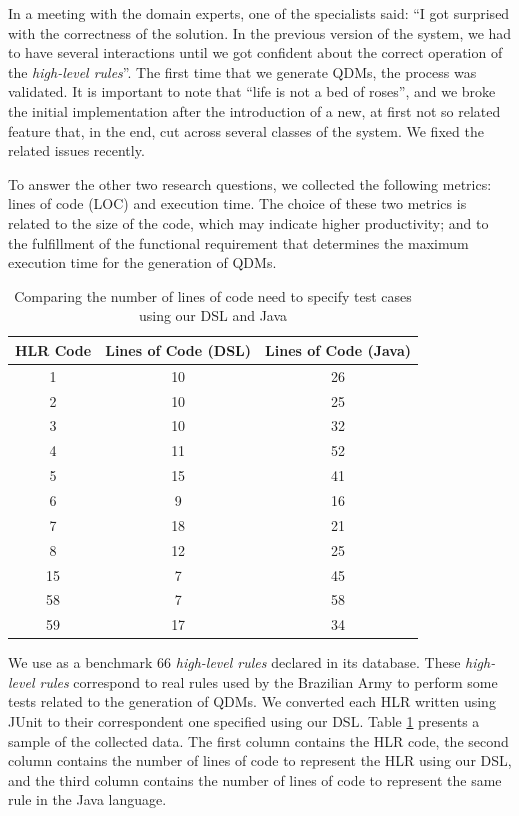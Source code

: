 \documentclass{bmcart}
\newcommand{\callers}{\emph{high-level rules}\xspace}
\newcommand{\shc}{HLR\xspace}
\begin{document}
In a meeting with the domain experts, one of the specialists said: ``I got surprised with the correctness of the solution. In the previous version of the system, we had to have several interactions until we got confident about the correct operation of the \callers''. The first time that we generate QDMs, the process was validated. It is important to note that ``life is not a bed of roses'', and we broke the initial implementation after the introduction of a new, at first not so related feature that, in the end, cut across several classes of the system. We fixed the related issues recently.  

To answer the other two research questions, we collected the following metrics: lines of code (LOC) and execution time. The choice of these two metrics is related to the size of the code, which may indicate higher productivity; and to the fulfillment of the functional requirement that determines the maximum execution time for the generation of QDMs.

\begin{table}[htb!]
	\centering
	\caption{Comparing the number of lines of code need to specify test cases using our DSL and Java}
	\label{table:comparacao}
	\begin{center}
		\begin{tabular}{ccc}
			\toprule
			\textbf{\shc Code} & \textbf{Lines of Code (DSL)} & \textbf{Lines of Code (Java)}     \\ \midrule
			1        & 10  & 26   \\ %
			2        & 10  & 25   \\ %
			3        & 10  & 32   \\ %
			4        & 11  & 52   \\ %
			5        & 15  & 41   \\ %
			6        & 9   & 16   \\ %
			7        & 18  & 21   \\ %
			8        & 12  & 25   \\ %
			15       & 7   & 45   \\ %
			58       & 7   & 58   \\ %
			59       & 17  & 34   \\ \bottomrule
		\end{tabular}
	\end{center}
\end{table}

We use as a benchmark 66 \callers declared in its database. These \callers correspond to real rules used by the Brazilian Army to perform some tests related to the generation of QDMs. We converted each \shc written using JUnit to their correspondent one specified using our DSL. Table \ref{table:comparacao} presents a sample of the collected data. The first column contains the \shc code, the second column contains the number of lines of code to represent the \shc using our DSL, and the third column contains the number of lines of code to represent the same rule in the Java language.
\end{document}
